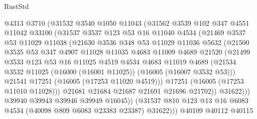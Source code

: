 \begin{lexlean}{RustStd}
\begin{coremodule}
                @4313
                @3710
                (@31532
                  @3540
                  @1050
                  @11043
                  (@31562
                    @3539
                    @102
                    @347
                    @4551
                    @11042
                    @33100
                    (@31537
                      @3537
                      @123
                      @53
                      @16
                      @11040
                      @4534
                      (@21469
                        @3537
                        @53
                        @11029
                        @11038
                        (@21630
                          @3536
                          @348
                          @53
                          @11029
                          @11036
                          @5632
                          (@21500
                            @3535
                            @53
                            @347
                            @4907
                            @11028
                            @11035
                            @4683
                            @11009
                            @4689
                            @21520
                            (@21499
                              @3533
                              @123
                              @53
                              @16
                              @11025
                              @4519
                              @4534
                              @4683
                              @11019
                              @4689
                              (@21534
                                @3532
                                @11025
                                (@16000 (@16001 @11025))
                                (@16005 (@16007 @3532 @53)))
                              @21541
                              @17251
                              (@16005 (@17253 @11020 @4519)))
                            @17251
                            (@16005 (@17253 @11010 @11028)))
                          @21681
                          @21684
                          @21687
                          @21691
                          @21696
                          @21702))
                      @31622)))
                @39940
                @39943
                @39946
                @39949
                @16045))
            (@31537 @810 @123 @13 @16 @6083 @4534 (@40098 @809 @6083 @23383 @23387) @31622)))
        @40109
        @40112
        @40115

\end{coremodule}
\end{lexlean}
